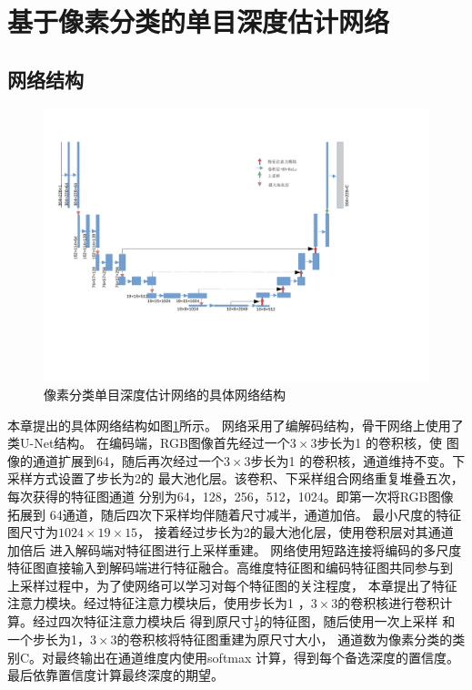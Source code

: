 \section{基于像素分类的单目深度估计网络}
\subsection{网络结构}
\begin{figure}[htb]
    \centering
    \includegraphics[width=0.9\linewidth]{figure/Architecture.pdf}
    \caption{像素分类单目深度估计网络的具体网络结构}
    \label{cls_architecture}
\end{figure}
本章提出的具体网络结构如图\ref{cls_architecture}所示。
网络采用了编解码结构，骨干网络上使用了类U-Net结构。
在编码端，RGB图像首先经过一个$3\times3$步长为1
的卷积核，使
图像的通道扩展到64，随后再次经过一个$3\times3$步长为1
的卷积核，通道维持不变。下采样方式设置了步长为2的
最大池化层。该卷积、下采样组合网络重复堆叠五次，每次获得的特征图通道
分别为64，128，256，512，1024。即第一次将RGB图像拓展到
64通道，随后四次下采样均伴随着尺寸减半，通道加倍。
最小尺度的特征图尺寸为$1024\times19\times15$，
接着经过步长为2的最大池化层，使用卷积层对其通道加倍后
进入解码端对特征图进行上采样重建。
网络使用短路连接将编码的多尺度
特征图直接输入到解码端进行特征融合。高维度特征图和编码特征图共同参与到
上采样过程中，为了使网络可以学习对每个特征图的关注程度，
本章提出了特征注意力模块。经过特征注意力模块后，使用步长为1
，$3\times3$的卷积核进行卷积计算。经过四次特征注意力模块后
得到原尺寸$\frac{1}{2}$的特征图，随后使用一次上采样
和一个步长为1，$3\times3$的卷积核将特征图重建为原尺寸大小，
通道数为像素分类的类别C。对最终输出在通道维度内使用softmax
计算，得到每个备选深度的置信度。最后依靠置信度计算最终深度的期望。

